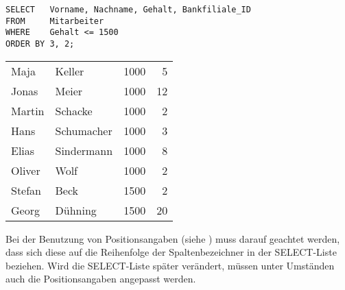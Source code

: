         \begin{lstlisting}[language=oracle_sql,caption={Die ORDER BY Klausel mit Positionsangaben},label=sql02_16]
SELECT   Vorname, Nachname, Gehalt, Bankfiliale_ID
FROM     Mitarbeiter
WHERE    Gehalt <= 1500
ORDER BY 3, 2;
        \end{lstlisting}
        \begin{center}
          \begin{small}
            \tablehead{}
            \tabletail{
            }
            \begin{msoraclesql}
              \begin{supertabular}{llrr}
                Maja & Keller & 1000 & 5 \\
                Jonas & Meier & 1000 & 12 \\
                Martin & Schacke & 1000 & 2 \\
                Hans & Schumacher & 1000 & 3 \\
                Elias & Sindermann & 1000 & 8 \\
                Oliver & Wolf & 1000 & 2 \\
                Stefan & Beck & 1500 & 2 \\
                Georg & Dühning & 1500 & 20 \\
                \end{supertabular}
            \end{msoraclesql}
          \end{small}
        \end{center}
        \begin{merke}
          Bei der Benutzung von Positionsangaben (siehe ) muss darauf geachtet werden, dass sich diese auf die Reihenfolge der Spaltenbezeichner in der SELECT-Liste beziehen. Wird die SELECT-Liste später verändert, müssen unter Umständen auch die Positionsangaben angepasst werden.
        \end{merke}
